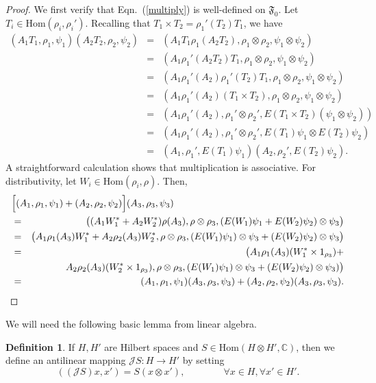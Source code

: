 \documentclass[12pt]{article}
\newcommand{\alg}[1]{\mathfrak{#1}}
\theoremstyle{definition}
\theoremstyle{definition}
\newtheorem{defn}[thm]{Definition}
\theoremstyle{remark}
\def\2#1{{\mathcal #1}}
\def\7#1{{\mathbb #1}}
\newcommand{\Hom}{\mathrm{Hom}}
\begin{document}
\begin{proof} We first verify that Eqn.\ (\ref{multiply}) is well-defined on $\alg{F}_0
  $.  Let $T_i\in \Hom (\rho _i,\rho _i')$.  Recalling that $T_1\times T_2=\rho
  _1'(T_2)T_1$, we have
\begin{eqnarray*}
  (A_1T_1,\rho _1,\psi _1)(A_2T_2,\rho _2,\psi _2) &=& (A_1T_1\rho _1(A_2T_2),\rho
  _1\otimes \rho _2,\psi _1\otimes \psi
  _2) \\
  &=& (A_1\rho _1'(A_2T_2)T_1,\rho _1\otimes \rho _2,\psi _1\otimes \psi _2) \\
  &=& (A_1\rho _1'(A_2)\rho _1'(T_2)T_1,\rho _1\otimes \rho _2,\psi _1\otimes \psi
  _2) \\
  &=& (A_1\rho _1'(A_2)(T_1\times T_2),\rho _1\otimes \rho _2,\psi _1\otimes \psi _2) \\
  &=& (A_1\rho _1'(A_2),\rho _1'\otimes \rho _2',E(T_1\times T_2)(\psi _1\otimes \psi _2)) \\
  &=& (A_1\rho _1'(A_2),\rho _1'\otimes \rho _2',E(T_1)\psi _1\otimes E(T_2)\psi _2) \\
  &=& (A_1,\rho _1',E(T_1)\psi _1)(A_2,\rho _2',E(T_2)\psi _2) .\end{eqnarray*} 
A straightforward calculation shows that multiplication is associative.  For
distributivity, let $W_i\in \Hom (\rho _i,\rho )$.  Then,
\begin{eqnarray*}
  \lefteqn{ \Bigl[ (A_1,\rho _1,\psi _1)+(A_2,\rho _2,\psi _2)\Bigr] (A_3,\rho _3,\psi _3) } \\
  &=& \bigl( (A_1W_1^*+A_2W_2^*)\rho
  (A_3),\rho \otimes \rho _3,(E(W_1)\psi _1+E(W_2)\psi _2)\otimes \psi _3 \bigr) \\
  &=& \bigl( A_1\rho _1(A_3)W_1^{*}+A_2\rho _2(A_3)W_2^*,\rho \otimes \rho _3,(E(W_1)\psi _1)\otimes \psi
  _3+(E(W_2)\psi _2)\otimes \psi _3 \bigr) \\
  &=& \bigl( A_1\rho _1(A_3)(W_1^{*}\times 1_{\rho _3})+\\
  && \qquad A_2\rho _2(A_3)(W_2^*\times 1_{\rho
    _3}), \rho \otimes \rho _3,(E(W_1)\psi _1)\otimes \psi _3+ (E(W_2)\psi _2)\otimes \psi _3 ) \bigr) \\
  &=& (A_1,\rho _1,\psi _1)(A_3,\rho _3,\psi _3)+(A_2,\rho _2,\psi _2)(A_3,\rho _3,\psi _3) .\end{eqnarray*}
\end{proof}

We will need the following basic lemma from linear algebra.

\begin{defn} If $H,H'$ are Hilbert spaces and $S\in \Hom (H\otimes H',\7C )$, then we
  define an antilinear mapping $\2JS:H\to H'$ by setting
  \[ ((\2JS)x,x')=S(x\otimes x') ,\qquad \qquad \forall x\in H,\forall
    x'\in H'.\]
\end{defn}
\end{document}
